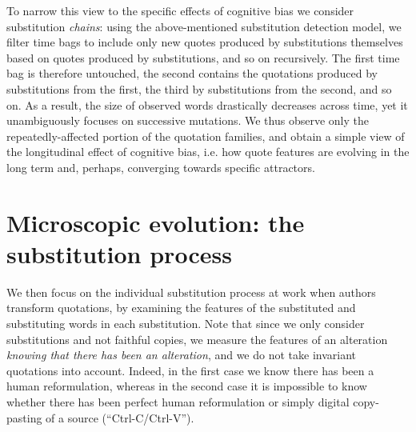 \bigskip
To narrow this view to the specific effects of cognitive bias we consider substitution \emph{chains}: using the above-mentioned substitution detection model, we filter time bags to include only new quotes produced by substitutions themselves based on quotes produced by substitutions, and so on recursively.
The first time bag is therefore untouched, the second contains the quotations produced by substitutions from the first, the third by substitutions from the second, and so on.
As a result, the size of observed words drastically decreases across time, yet it unambiguously focuses on successive mutations.
We thus observe only the repeatedly-affected portion of the quotation families, and obtain a simple view of the longitudinal effect of cognitive bias, \hbox{i.e.} how quote features are evolving in the long term and, perhaps, converging towards specific attractors.




\section{Microscopic evolution: the substitution process}

We then focus on the individual substitution process at work when authors transform quotations, by examining the features of the substituted and substituting words in each substitution.
Note that since we only consider substitutions and not faithful copies, we measure the features of an alteration \emph{knowing that there has been an alteration}, and we do not take invariant quotations into account.
Indeed, in the first case we know there has been a human reformulation, whereas in the second case it is impossible to know whether there has been perfect human reformulation or simply digital copy-pasting of a source (``{\sc Ctrl-C}/{\sc Ctrl-V}'').

